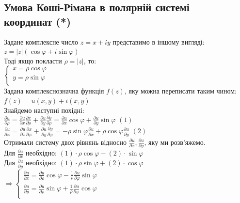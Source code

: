 \documentclass[a4paper, 14pt]{extarticle}
\begin{document}
	\subsection{Умова Коші-Рімана в полярній системі \\координат (*)}
	Задане комплексне число $z=x+iy$ представимо в іншому вигляді:
	$z=|z|(\cos \varphi + i \sin \varphi)$\\
	Тоді якщо покласти $\rho = |z|$, то:
	\\$\begin{cases}
	\displaystyle x = \rho \cos \varphi \\
	\displaystyle y = \rho \sin \varphi \\
	\end{cases}$\\
	Задана комплекснозначна функція $f(z)$, яку можна переписати таким чином:\\
	$f(z) = u(x,y) + i(x,y)$\\
	Знайдемо наступні похідні:\\
	$\displaystyle\frac{\partial u}{\partial \rho} = \frac{\partial u}{\partial x}\frac{\partial x}{\partial \rho}+\frac{\partial u}{\partial y}\frac{\partial y}{\partial \rho} = \frac{\partial u}{\partial x} \cos \varphi+\frac{\partial u}{\partial y} \sin \varphi$ $(1)$\\
	$\displaystyle\frac{\partial u}{\partial \varphi} = \frac{\partial u}{\partial x}\frac{\partial x}{\partial \varphi}+\frac{\partial u}{\partial y}\frac{\partial y}{\partial \varphi} = -\rho \sin \varphi\frac{\partial u}{\partial x} + \rho \cos \varphi \frac{\partial u}{\partial y}$ $(2)$\\
	Отримали систему двох рівнянь відносно $\displaystyle \frac{\partial u}{\partial x}, \frac{\partial u}{\partial y}$, яку ми розв'яжемо.\\
	Для $\displaystyle \frac{\partial u}{\partial x}$ необхідно: $(1)\cdot \rho \cos \varphi - (2)\cdot \sin \varphi$\\
	Для $\displaystyle \frac{\partial u}{\partial y}$ необхідно: $(1)\cdot \rho \sin \varphi + (2)\cdot \cos \varphi$\\
	$\Rightarrow \begin{cases}
				 \displaystyle \frac{\partial u}{\partial x} = \displaystyle \frac{\partial u}{\partial \rho} \cos \varphi - \frac{1}{\rho} \frac{\partial u}{\partial \varphi} \sin \varphi\\
				 \displaystyle \frac{\partial u}{\partial y} = \displaystyle \frac{\partial u}{\partial \rho} \sin \varphi + \frac{1}{\rho} \frac{\partial u}{\partial \varphi} \cos \varphi\\
				 \end{cases}$\\
\end{document}
